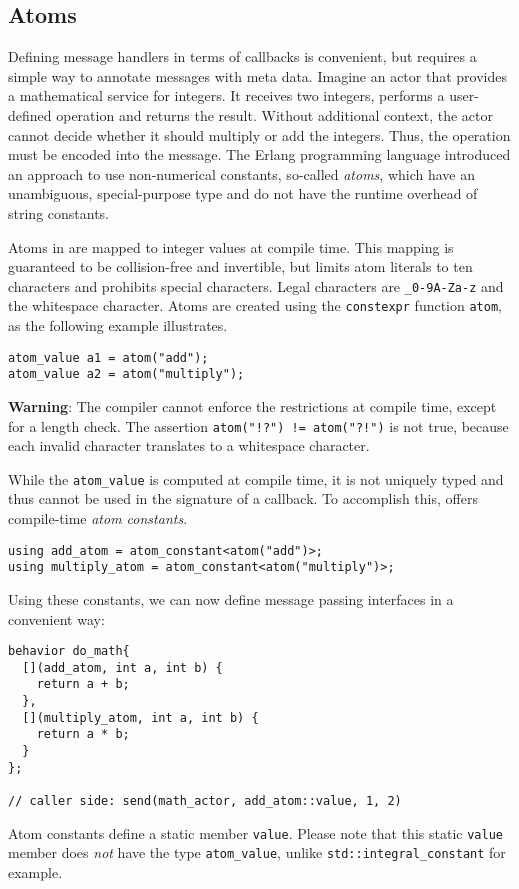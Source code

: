 \clearpage
\subsection{Atoms}
\label{atom}

Defining message handlers in terms of callbacks is convenient, but requires a
simple way to annotate messages with meta data. Imagine an actor that provides
a mathematical service for integers. It receives two integers, performs a
user-defined operation and returns the result. Without additional context, the
actor cannot decide whether it should multiply or add the integers. Thus, the
operation must be encoded into the message. The Erlang programming language
introduced an approach to use non-numerical constants, so-called
\textit{atoms}, which have an unambiguous, special-purpose type and do not have
the runtime overhead of string constants.

Atoms in \lib are mapped to integer values at compile time. This mapping is
guaranteed to be collision-free and invertible, but limits atom literals to ten
characters and prohibits special characters. Legal characters are
\lstinline^_0-9A-Za-z^ and the whitespace character. Atoms are created using
the \lstinline^constexpr^ function \lstinline^atom^, as the following example
illustrates.

\begin{lstlisting}
atom_value a1 = atom("add");
atom_value a2 = atom("multiply");
\end{lstlisting}

\textbf{Warning}: The compiler cannot enforce the restrictions at compile time,
except for a length check. The assertion \lstinline^atom("!?") != atom("?!")^
is not true, because each invalid character translates to a whitespace
character.

While the \lstinline^atom_value^ is computed at compile time, it is not
uniquely typed and thus cannot be used in the signature of a callback. To
accomplish this, \lib offers compile-time \emph{atom constants}.

\begin{lstlisting}
using add_atom = atom_constant<atom("add")>;
using multiply_atom = atom_constant<atom("multiply")>;
\end{lstlisting}

Using these constants, we can now define message passing interfaces in a
convenient way:

\begin{lstlisting}
behavior do_math{
  [](add_atom, int a, int b) {
    return a + b;
  },
  [](multiply_atom, int a, int b) {
    return a * b;
  }
};

// caller side: send(math_actor, add_atom::value, 1, 2)
\end{lstlisting}

Atom constants define a static member \lstinline^value^. Please note that this
static \lstinline^value^ member does \emph{not} have the type
\lstinline^atom_value^, unlike \lstinline^std::integral_constant^ for example.

